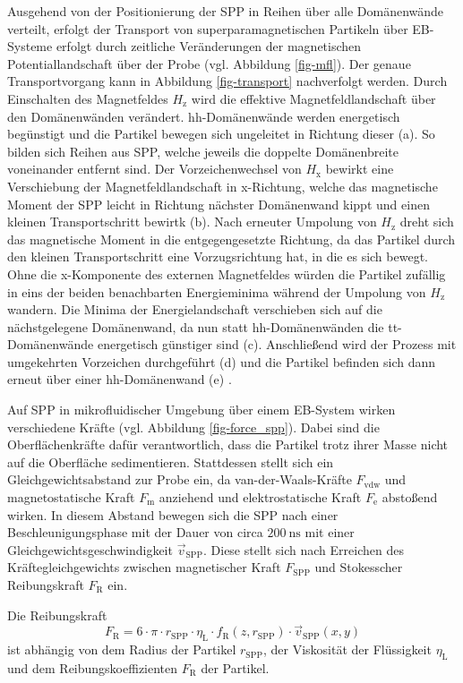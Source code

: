 \documentclass[page,pdftex,12pt,a4paper,twoside,openright]{scrbook}
\begin{document}
Ausgehend von der Positionierung der SPP in Reihen über alle Domänenwände verteilt, erfolgt der Transport von superparamagnetischen Partikeln über EB-Systeme erfolgt durch zeitliche Veränderungen der magnetischen Potentiallandschaft über der Probe (vgl. Abbildung \ref{fig-mfl}). Der genaue Transportvorgang kann in Abbildung \ref{fig-transport} nachverfolgt werden. Durch Einschalten des Magnetfeldes \(H_\mathrm{z}\) wird die effektive Magnetfeldlandschaft über den Domänenwänden verändert. hh-Domänenwände werden energetisch begünstigt und die Partikel bewegen sich ungeleitet in Richtung dieser (a). So bilden sich Reihen aus SPP, welche jeweils die doppelte Domänenbreite voneinander entfernt sind. Der Vorzeichenwechsel von \(H_\mathrm{x}\) bewirkt eine Verschiebung der Magnetfeldlandschaft in x-Richtung, welche das magnetische Moment der SPP leicht in Richtung nächster Domänenwand kippt und einen kleinen Transportschritt bewirtk (b). Nach erneuter Umpolung von \(H_\mathrm{z}\) dreht sich das magnetische Moment in die entgegengesetzte Richtung, da das Partikel durch den kleinen Transportschritt eine Vorzugsrichtung hat, in die es sich bewegt. Ohne die x-Komponente des externen Magnetfeldes würden die Partikel zufällig in eins der beiden benachbarten Energieminima während der Umpolung von \(H_\mathrm{z}\) wandern. Die Minima der Energielandschaft verschieben sich auf die nächstgelegene Domänenwand, da nun statt hh-Domänenwänden die tt-Domänenwände energetisch günstiger sind (c). Anschließend wird der Prozess mit umgekehrten Vorzeichen durchgeführt (d) und die Partikel befinden sich dann erneut über einer hh-Domänenwand (e) \cite{holzinger_directed_2015}. 

Auf SPP in mikrofluidischer Umgebung über einem EB-System wirken verschiedene Kräfte (vgl. Abbildung \ref{fig-force_spp}). Dabei sind die Oberflächenkräfte dafür verantwortlich, dass die Partikel trotz ihrer Masse nicht auf die Oberfläche sedimentieren.  Stattdessen stellt sich ein Gleichgewichtsabstand zur Probe ein, da van-der-Waals-Kräfte \(F_\mathrm{vdw}\) und magnetostatische Kraft \(F_\mathrm{m}\) anziehend und elektrostatische Kraft \(F_\mathrm{e}\) abstoßend wirken. In diesem Abstand bewegen sich die SPP nach einer Beschleunigungsphase mit der Dauer von circa \(\SI{200}{\nano\s}\) mit einer Gleichgewichtsgeschwindigkeit \(\vec{v}_\mathrm{SPP}\). Diese stellt sich nach Erreichen des Kräftegleichgewichts zwischen magnetischer Kraft \(F_\mathrm{SPP}\) und Stokesscher Reibungskraft \(F_\mathrm{R}\) ein.

Die Reibungskraft
\begin{equation}
F_\mathrm{R} = 6 \cdot \pi \cdot r_\mathrm{SPP} \cdot \eta_\mathrm{L} \cdot f_\mathrm{R}(z,r_\mathrm{SPP}) \cdot \vec{v}_\mathrm{SPP}(x,y)
\end{equation}
ist abhängig von dem Radius der Partikel \(r_\mathrm{SPP}\), der Viskosität der Flüssigkeit \(\eta_\mathrm{L}\) und dem Reibungskoeffizienten \(F_\mathrm{R}\) der Partikel.
\end{document}
